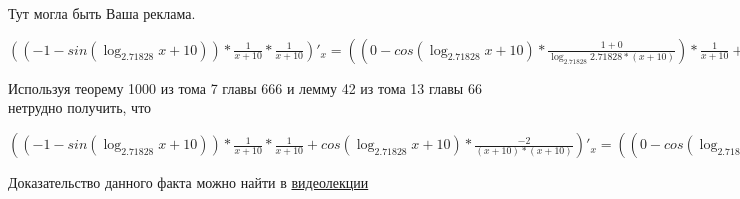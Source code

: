 \documentclass[12pt,a4paper,fleqn]{article}
\theoremstyle{definition}
\begin{document}
Тут могла быть Ваша реклама. 

$(( -1  - sin(\log_{ 2.71828 }{ x  +  10 })) * \frac{ 1 }{ x  +  10 }
 * \frac{ 1 }{ x  +  10 }
)'_{x} = (( 0  - cos(\log_{ 2.71828 }{ x  +  10 }) * \frac{ 1  +  0 }{\log_{ 2.71828 }{ 2.71828 } * ( x  +  10 )}
) * \frac{ 1 }{ x  +  10 }
 + ( -1  - sin(\log_{ 2.71828 }{ x  +  10 })) * \frac{ 0  * ( x  +  10 ) -  1  * ( 1  +  0 )}{( x  +  10 ) * ( x  +  10 )}
) * \frac{ 1 }{ x  +  10 }
 + ( -1  - sin(\log_{ 2.71828 }{ x  +  10 })) * \frac{ 1 }{ x  +  10 }
 * \frac{ 0  * ( x  +  10 ) -  1  * ( 1  +  0 )}{( x  +  10 ) * ( x  +  10 )}
$

Используя теорему 1000 из тома 7 главы 666 и лемму 42 из тома 13 главы 66 нетрудно получить, что 

$(( -1  - sin(\log_{ 2.71828 }{ x  +  10 })) * \frac{ 1 }{ x  +  10 }
 * \frac{ 1 }{ x  +  10 }
 + cos(\log_{ 2.71828 }{ x  +  10 }) * \frac{ -2 }{( x  +  10 ) * ( x  +  10 )}
)'_{x} = (( 0  - cos(\log_{ 2.71828 }{ x  +  10 }) * \frac{ 1  +  0 }{\log_{ 2.71828 }{ 2.71828 } * ( x  +  10 )}
) * \frac{ 1 }{ x  +  10 }
 + ( -1  - sin(\log_{ 2.71828 }{ x  +  10 })) * \frac{ 0  * ( x  +  10 ) -  1  * ( 1  +  0 )}{( x  +  10 ) * ( x  +  10 )}
) * \frac{ 1 }{ x  +  10 }
 + ( -1  - sin(\log_{ 2.71828 }{ x  +  10 })) * \frac{ 1 }{ x  +  10 }
 * \frac{ 0  * ( x  +  10 ) -  1  * ( 1  +  0 )}{( x  +  10 ) * ( x  +  10 )}
 + ( -1  - sin(\log_{ 2.71828 }{ x  +  10 })) * \frac{ 1  +  0 }{\log_{ 2.71828 }{ 2.71828 } * ( x  +  10 )}
 * \frac{ -2 }{( x  +  10 ) * ( x  +  10 )}
 + cos(\log_{ 2.71828 }{ x  +  10 }) * \frac{ 0  * ( x  +  10 ) * ( x  +  10 ) -  -2  * (( 1  +  0 ) * ( x  +  10 ) + ( x  +  10 ) * ( 1  +  0 ))}{( x  +  10 ) * ( x  +  10 ) * ( x  +  10 ) * ( x  +  10 )}
$

Доказательство данного факта можно найти в \href{https://www.youtube.com/watch?v=dQw4w9WgXcQ}{видеолекции} 
\end{document}
